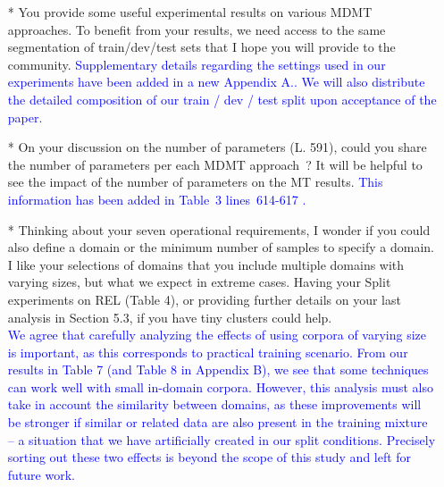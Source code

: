 \documentclass[12pt,times,a4paper,twoside]{article}
\newcommand{\fyTodo}[1]{\Todo[FY:]{\textcolor{orange}{#1}}}
\theoremstyle{definition}
\begin{document}
\begin{itemize}
\item[*] You provide some useful experimental results on various MDMT approaches. To benefit from your results, we need access to the same segmentation of train/dev/test sets that I hope you will provide to the community.
\textcolor{blue}{Supplementary details regarding the settings used in our experiments have been added in a new Appendix A.\fyTodo{Fix the appendix.}. We will also distribute the detailed composition of our train / dev / test split upon acceptance of the paper.}
\\
\item[*] On your discussion on the number of parameters (L. 591), could you share the number of parameters per each MDMT approach~? It will be helpful to see  the impact of the number of parameters on the MT results.
  \textcolor{blue}{This information has been added in Table~3 lines~614-617 \fyTodo{Check number, page and line number and content}.}
\\ 
\item[*] Thinking about your seven operational requirements, I wonder if you could also define a domain or the minimum number of samples to specify a domain. I like your selections of domains that you include multiple domains with varying sizes, but what we expect in extreme cases. Having your Split experiments on REL (Table 4), or providing further details on your last analysis in Section 5.3, if you have tiny clusters could help.\fyTodo{Answer this with more experiments ?}
  \\
  \textcolor{blue}{We agree that carefully analyzing the effects of using corpora of varying size is important, as this corresponds to practical training scenario. From our results in Table 7 (and Table 8 in Appendix B), we see that some techniques can work well with small in-domain corpora. However, this analysis must also take in account the similarity between domains, as these improvements will be stronger if similar or related data are also present in the training mixture -- a situation that we have artificially created in our split conditions. Precisely sorting out these two effects is beyond the scope of this study and left for future work.}
  

\end{itemize}
\end{document}
